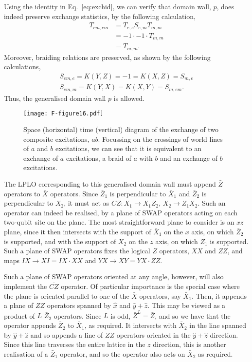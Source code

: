 \documentclass[pra,twocolumn,a4paper,nofootinbib]{revtex4-1}
\begin{document}
Using the identity in Eq.~\ref{eq:exchid}, we can verify that domain wall, $p$, does indeed preserve exchange statistics, by the following calculation,
\begin{align}
T_{em,em} &=T_{e,e}  S_{e,m} T_{m,m}\\
&=-1  \cdot -1 \cdot T_{m,m}\\
&=T_{m,m}.
\end{align}
Moreover, braiding relations are preserved, as shown by the following calculations,
\begin{align}
S_{em,e}=K(Y,Z)=-1=K(X,Z)=S_{m,e}\\
S_{em,m}=K(Y,X)=K(X,Y)=S_{m,em}.
\end{align}
Thus, the generalised domain wall $p$ is allowed.

\begin{figure}
\centering
\texttt{[image: F-figure16.pdf]}
\caption{Space (horizontal) time (vertical) diagram of the exchange of two composite excitations, $ab$. Focussing on the crossings of world lines of $a$ and $b$ excitations, we can see that it is equivalent to an exchange of $a$ excitations, a braid of $a$ with $b$ and an exchange of $b$ excitations. \label{fig:exchid}}
\end{figure}


The LPLO corresponding to this generalised domain wall must append $\bar{Z}$ operators to $\bar{X}$ operators. Since $\bar{Z}_1$ is perpendicular to $\bar{X}_1$ and $\bar{Z}_2$ is perpendicular to $\bar{X}_2$, it must act as $\overline{CZ}: X_1 \to X_1 Z_2,\, X_2 \to Z_1X_2$. Such an operator can indeed be realised, by a plane of SWAP operators acting on each two-qubit site on the plane. The most straightforward plane to consider is an $xz$ plane, since it then intersects with the support of $\bar{X}_1$ on the $x$ axis, on which $\bar{Z}_2$ is supported, and with the support of $\bar{X}_2$ on the $z$ axis, on which $\bar{Z}_1$ is supported. Such a plane of SWAP operators fixes the logical $Z$ operators, $XX$ and $ZZ$, and maps $IX \to XI=IX \cdot XX$ and $YX \to XY = YX \cdot ZZ$.

Such a plane of SWAP operators oriented at any angle, however, will also implement the $\overline{CZ}$ operator. Of particular importance is the special case where the plane is oriented parallel to one of the $\bar{X}$ operators, say $\bar{X}_1$. Then, it appends a plane of $ZZ$ operators spanned by $\hat{x}$ and $\hat{y}+\hat{z}$. This may be viewed as a product of $L$ $\bar{Z}_2$ operators. Since $L$ is odd, $\bar{Z}^L=\bar{Z}$, and so we have that the operator appends $\bar{Z}_2$ to $\bar{X}_1$, as required. It intersects with $\bar{X}_2$ in the line spanned by $\hat{y}+\hat{z}$ and so appends a line of $ZZ$ operators oriented in the $\hat{y}+\hat{z}$ direction. Since this line traverses the entire lattice in the $z$ direction, this is another realisation of a $\bar{Z}_1$ operator, and so the operator also acts on $\bar{X}_2$ as required.
\end{document}
